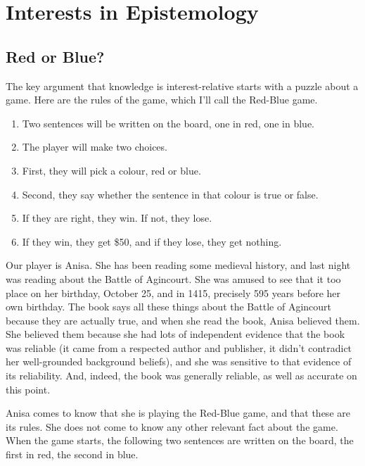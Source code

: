 \documentclass[11pt,]{book}
\providecommand{\tightlist}{%
  \setlength{\itemsep}{0pt}\setlength{\parskip}{0pt}}
\begin{document}
\hypertarget{interests}{%
\chapter{Interests in Epistemology}\label{interests}}

\hypertarget{redblue}{%
\section{Red or Blue?}\label{redblue}}

The key argument that knowledge is interest-relative starts with a puzzle about a game. Here are the rules of the game, which I'll call the Red-Blue game.

\begin{enumerate}
\def\labelenumi{\arabic{enumi}.}
\tightlist
\item
  Two sentences will be written on the board, one in red, one in blue.
\item
  The player will make two choices.
\item
  First, they will pick a colour, red or blue.
\item
  Second, they say whether the sentence in that colour is true or
  false.
\item
  If they are right, they win. If not, they lose.
\item
  If they win, they get \$50, and if they lose, they get nothing.
\end{enumerate}

Our player is Anisa. She has been reading some medieval history, and last night was reading about the Battle of Agincourt. She was amused to see that it too place on her birthday, October 25, and in 1415, precisely 595 years before her own birthday. The book says all these things about the Battle of Agincourt because they are actually true, and when she read the book, Anisa believed them. She believed them because she had lots of independent evidence that the book was reliable (it came from a respected author and publisher, it didn't contradict her well-grounded background beliefs), and she was sensitive to that evidence of its reliability. And, indeed, the book was generally reliable, as well as accurate on this point.

Anisa comes to know that she is playing the Red-Blue game, and that these are its rules. She does not come to know any other relevant fact about the game. When the game starts, the following two sentences are written on the board, the first in red, the second in blue.
\end{document}
